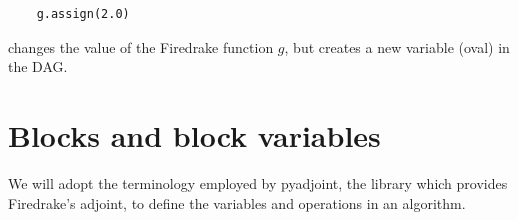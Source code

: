 \documentclass[a4paper,12pt]{report}
\begin{document}
\begin{verbatim}
    g.assign(2.0)
\end{verbatim}

changes the value of the Firedrake function $g$, but creates a new variable
(oval) in the DAG.

\section{Blocks and block variables}


We will adopt the terminology employed by pyadjoint, the library which provides
Firedrake's adjoint, to define the variables and operations in an algorithm.
\end{document}

